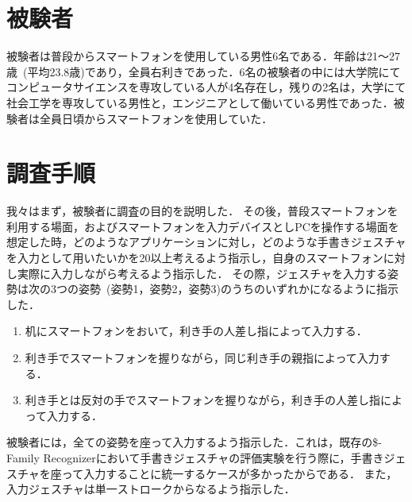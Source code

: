\section{被験者}
被験者は普段からスマートフォンを使用している男性6名である．年齢は21〜27歳~(平均23.8歳)であり，全員右利きであった．6名の被験者の中には大学院にてコンピュータサイエンスを専攻している人が4名存在し，残りの2名は，大学にて社会工学を専攻している男性と，エンジニアとして働いている男性であった．被験者は全員日頃からスマートフォンを使用していた．



\section{調査手順}
我々はまず，被験者に調査の目的を説明した．
その後，普段スマートフォンを利用する場面，およびスマートフォンを入力デバイスとしPCを操作する場面を想定した時，どのようなアプリケーションに対し，どのような手書きジェスチャを入力として用いたいかを20以上考えるよう指示し，自身のスマートフォンに対し実際に入力しながら考えるよう指示した．
その際，ジェスチャを入力する姿勢は次の3つの姿勢~(姿勢1，姿勢2，姿勢3)のうちのいずれかになるように指示した．
\begin{enumerate}
\item 机にスマートフォンをおいて，利き手の人差し指によって入力する．
\item 利き手でスマートフォンを握りながら，同じ利き手の親指によって入力する．
\item 利き手とは反対の手でスマートフォンを握りながら，利き手の人差し指によって入力する．
\end{enumerate}
被験者には，全ての姿勢を座って入力するよう指示した．これは，既存の\$-Family Recognizerにおいて手書きジェスチャの評価実験を行う際に，手書きジェスチャを座って入力することに統一するケースが多かったからである．
また，入力ジェスチャは単一ストロークからなるよう指示した．

